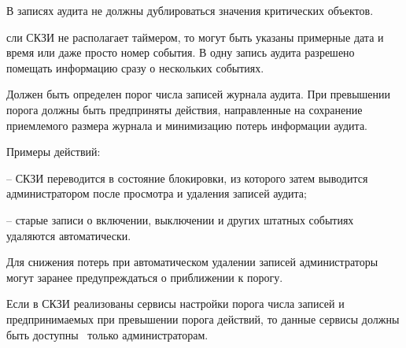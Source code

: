 В записях аудита не должны дублироваться значения критических объектов.

\begin{note*}
сли СКЗИ не располагает таймером, то могут быть указаны примерные 
дата и время или даже просто номер события.
%
В одну запись аудита разрешено помещать информацию сразу о нескольких событиях. 
\end{note*}


\label{R.AU.Over} %
Должен быть определен порог числа записей журнала аудита.
При превышении порога должны быть предприняты действия,
направленные на сохранение приемлемого размера журнала
и минимизацию потерь информации аудита.

\begin{note}
Примеры действий:

-- СКЗИ переводится в состояние блокировки, из которого затем выводится
администратором после просмотра и удаления записей аудита;

-- старые записи о включении, выключении и других штатных событиях удаляются 
автоматически. 

Для снижения потерь при автоматическом удалении записей 
администраторы могут заранее предупреждаться о приближении к порогу.
\end{note}

\label{R.AU.Settings} %
Если в СКЗИ реализованы сервисы настройки порога числа записей и 
предпринимаемых при превышении порога действий, то данные сервисы должны 
быть доступны~ только администраторам. 

